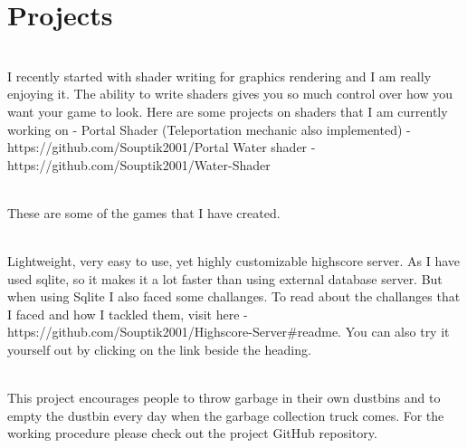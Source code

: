 \documentclass[]{deedy-resume-openfont}
\begin{document}
       \section{Projects}
       \raggedright
         
       
           \hfill {}\\
           I recently started with shader writing for graphics rendering and I am really enjoying it. The ability to write shaders gives you so much control over how you want your game to look. Here are some projects on shaders that I am currently working on - Portal Shader (Teleportation mechanic also implemented) - https://github.com/Souptik2001/Portal
Water shader - https://github.com/Souptik2001/Water-Shader\\
           \sectionsep
           
           
           \hfill {}\\
           These are some of the games that I have created.\\
           \sectionsep
           
           
           
           \hfill {}\\
           Lightweight, very easy to use, yet highly customizable highscore server. As I have used sqlite, so it makes it a lot faster than using external database server. But when using Sqlite I also faced some challanges. To read about the challanges that I faced and how I tackled them, visit here - https://github.com/Souptik2001/Highscore-Server#readme. You can also try it yourself out by clicking on the link beside the heading.\\
           \sectionsep
         
         
       
           \hfill {}\\
           This project encourages people to throw garbage in their own dustbins and to empty the dustbin every day when the garbage collection truck comes. For the working procedure please check out the project GitHub repository.\\
           \sectionsep
         
\end{document}
